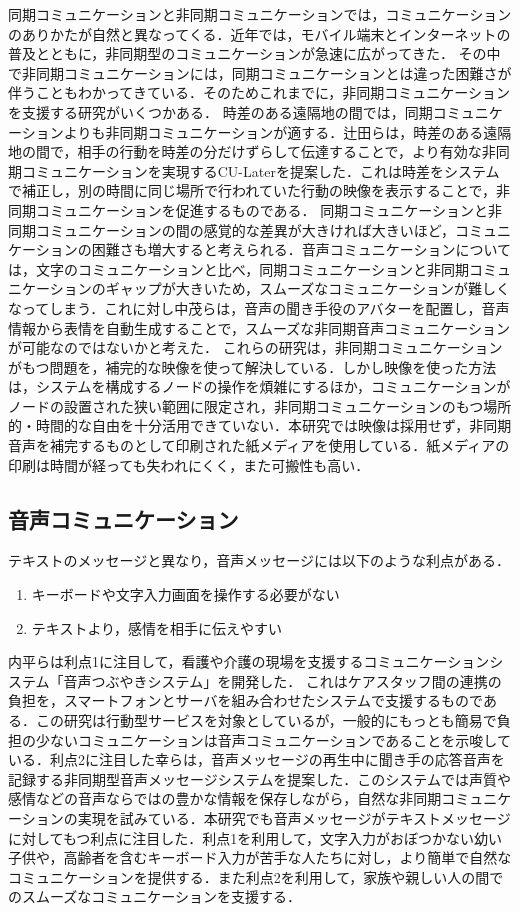 \documentclass[submit,techrep,noauthor]{ipsj}
\begin{document}
同期コミュニケーションと非同期コミュニケーションでは，コミュニケーションのありかたが自然と異なってくる．近年では，モバイル端末とインターネットの普及とともに，非同期型のコミュニケーションが急速に広がってきた\cite{white_paper_infor_commun_japan-1}．
その中で非同期コミュニケーションには，同期コミュニケーションとは違った困難さが伴うこともわかってきている．そのためこれまでに，非同期コミュニケーションを支援する研究がいくつかある．
時差のある遠隔地の間では，同期コミュニケーションよりも非同期コミュニケーションが適する．辻田らは，時差のある遠隔地の間で，相手の行動を時差の分だけずらして伝達することで，より有効な非同期コミュニケーションを実現するCU-Laterを提案した．これは時差をシステムで補正し，別の時間に同じ場所で行われていた行動の映像を表示することで，非同期コミュニケーションを促進するものである．
同期コミュニケーションと非同期コミュニケーションの間の感覚的な差異が大きければ大きいほど，コミュニケーションの困難さも増大すると考えられる．音声コミュニケーションについては，文字のコミュニケーションと比べ，同期コミュニケーションと非同期コミュニケーションのギャップが大きいため，スムーズなコミュニケーションが難しくなってしまう．これに対し中茂らは，音声の聞き手役のアバターを配置し，音声情報から表情を自動生成することで，スムーズな非同期音声コミュニケーションが可能なのではないかと考えた．
これらの研究は，非同期コミュニケーションがもつ問題を，補完的な映像を使って解決している．しかし映像を使った方法は，システムを構成するノードの操作を煩雑にするほか，コミュニケーションがノードの設置された狭い範囲に限定され，非同期コミュニケーションのもつ場所的・時間的な自由を十分活用できていない．本研究では映像は採用せず，非同期音声を補完するものとして印刷された紙メディアを使用している．紙メディアの印刷は時間が経っても失われにくく，また可搬性も高い．

\subsection{音声コミュニケーション}
テキストのメッセージと異なり，音声メッセージには以下のような利点がある．
\begin{enumerate}
    \item キーボードや文字入力画面を操作する必要がない
    \item テキストより，感情を相手に伝えやすい
\end{enumerate}
内平らは利点1に注目して，看護や介護の現場を支援するコミュニケーションシステム「音声つぶやきシステム」を開発した\cite{tsubuyaki-service}． これはケアスタッフ間の連携の負担を，スマートフォンとサーバを組み合わせたシステムで支援するものである．この研究は行動型サービスを対象としているが，一般的にもっとも簡易で負担の少ないコミュニケーションは音声コミュニケーションであることを示唆している．利点2に注目した幸ら\cite{asynchronous-message}は，音声メッセージの再生中に聞き手の応答音声を記録する非同期型音声メッセージシステムを提案した．このシステムでは声質や感情などの音声ならではの豊かな情報を保存しながら，自然な非同期コミュニケーションの実現を試みている．本研究でも音声メッセージがテキストメッセージに対してもつ利点に注目した．利点1を利用して，文字入力がおぼつかない幼い子供や，高齢者を含むキーボード入力が苦手な人たちに対し，より簡単で自然なコミュニケーションを提供する．また利点2を利用して，家族や親しい人の間でのスムーズなコミュニケーションを支援する．
\end{document}
